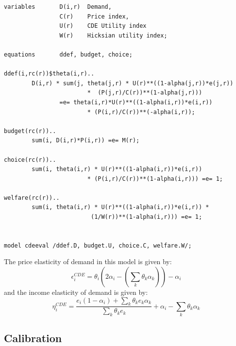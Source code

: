 \begin{Verbatim}
variables       D(i,r)  Demand,
                C(r)    Price index,
                U(r)    CDE Utility index
                W(r)    Hicksian utility index;

equations       ddef, budget, choice;

ddef(i,rc(r))$theta(i,r)..
        D(i,r) * sum(j, theta(j,r) * U(r)**((1-alpha(j,r))*e(j,r)) 
                        *  (P(j,r)/C(r))**(1-alpha(j,r))) 
                =e= theta(i,r)*U(r)**((1-alpha(i,r))*e(i,r)) 
                        * (P(i,r)/C(r))**(-alpha(i,r));

budget(rc(r))..
        sum(i, D(i,r)*P(i,r)) =e= M(r);

choice(rc(r))..
        sum(i, theta(i,r) * U(r)**((1-alpha(i,r))*e(i,r)) 
                        * (P(i,r)/C(r))**(1-alpha(i,r))) =e= 1;

welfare(rc(r))..
        sum(i, theta(i,r) * U(r)**((1-alpha(i,r))*e(i,r)) * 
                         (1/W(r))**(1-alpha(i,r))) =e= 1;


model cdeeval /ddef.D, budget.U, choice.C, welfare.W/;
\end{Verbatim}

The price elasticity of demand in this model is given by:
$$\epsilon^{CDE}_i = \theta_i \left( 2 \alpha_i - \left( \sum_k \theta_k
\alpha_k \right)\right) - \alpha_i$$
and the income elasticity of demand is given by:
$$\eta^{CDE}_i = \frac{ e_i (1-\alpha_i) + \sum_k \theta_k e_k
\alpha_k}{\sum_k \theta_k e_k} + \alpha_i - \sum_k \theta_k \alpha_k$$

\subsection*{Calibration}

